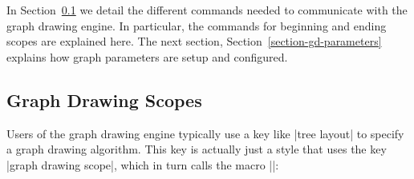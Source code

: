 
In Section~\ref{section-gd-scopes} we detail the different commands
needed to communicate with the graph drawing engine. In particular,
the commands for beginning and ending scopes are explained here. The
next section, Section~\ref{section-gd-parameters} explains how graph
parameters are setup and configured.


\subsection{Graph Drawing Scopes}
\label{section-gd-scopes}

Users of the graph drawing engine typically use a key like
|tree layout| to specify a graph drawing algorithm. This key is
actually just a style that uses the key |graph drawing scope|, which
in turn calls the macro |\pgfgdbeginscope|:

